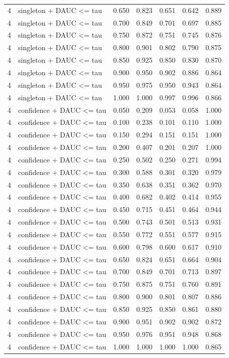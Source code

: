 \begin{tabular}{rlrrrrr}
4 & singleton + DAUC <= tau & 0.650 & 0.823 & 0.651 & 0.642 & 0.889 \\
4 & singleton + DAUC <= tau & 0.700 & 0.849 & 0.701 & 0.697 & 0.885 \\
4 & singleton + DAUC <= tau & 0.750 & 0.872 & 0.751 & 0.745 & 0.876 \\
4 & singleton + DAUC <= tau & 0.800 & 0.901 & 0.802 & 0.790 & 0.875 \\
4 & singleton + DAUC <= tau & 0.850 & 0.925 & 0.850 & 0.830 & 0.870 \\
4 & singleton + DAUC <= tau & 0.900 & 0.950 & 0.902 & 0.886 & 0.864 \\
4 & singleton + DAUC <= tau & 0.950 & 0.975 & 0.950 & 0.943 & 0.864 \\
4 & singleton + DAUC <= tau & 1.000 & 1.000 & 0.997 & 0.996 & 0.866 \\
4 & confidence + DAUC <= tau & 0.050 & 0.209 & 0.053 & 0.058 & 1.000 \\
4 & confidence + DAUC <= tau & 0.100 & 0.238 & 0.101 & 0.110 & 1.000 \\
4 & confidence + DAUC <= tau & 0.150 & 0.294 & 0.151 & 0.151 & 1.000 \\
4 & confidence + DAUC <= tau & 0.200 & 0.407 & 0.201 & 0.207 & 1.000 \\
4 & confidence + DAUC <= tau & 0.250 & 0.502 & 0.250 & 0.271 & 0.994 \\
4 & confidence + DAUC <= tau & 0.300 & 0.588 & 0.301 & 0.320 & 0.979 \\
4 & confidence + DAUC <= tau & 0.350 & 0.638 & 0.351 & 0.362 & 0.970 \\
4 & confidence + DAUC <= tau & 0.400 & 0.682 & 0.402 & 0.414 & 0.955 \\
4 & confidence + DAUC <= tau & 0.450 & 0.715 & 0.451 & 0.464 & 0.944 \\
4 & confidence + DAUC <= tau & 0.500 & 0.743 & 0.501 & 0.513 & 0.931 \\
4 & confidence + DAUC <= tau & 0.550 & 0.772 & 0.551 & 0.577 & 0.915 \\
4 & confidence + DAUC <= tau & 0.600 & 0.798 & 0.600 & 0.617 & 0.910 \\
4 & confidence + DAUC <= tau & 0.650 & 0.824 & 0.651 & 0.664 & 0.904 \\
4 & confidence + DAUC <= tau & 0.700 & 0.849 & 0.701 & 0.713 & 0.897 \\
4 & confidence + DAUC <= tau & 0.750 & 0.875 & 0.751 & 0.760 & 0.891 \\
4 & confidence + DAUC <= tau & 0.800 & 0.900 & 0.801 & 0.807 & 0.886 \\
4 & confidence + DAUC <= tau & 0.850 & 0.925 & 0.850 & 0.861 & 0.880 \\
4 & confidence + DAUC <= tau & 0.900 & 0.951 & 0.902 & 0.902 & 0.872 \\
4 & confidence + DAUC <= tau & 0.950 & 0.976 & 0.951 & 0.948 & 0.868 \\
4 & confidence + DAUC <= tau & 1.000 & 1.000 & 1.000 & 1.000 & 0.865 \\
\bottomrule
\end{tabular}
